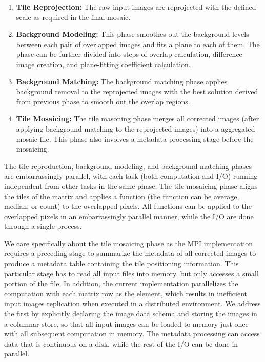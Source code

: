 \documentclass{acm_proc_article-sp}
\begin{document}
\begin{enumerate}
\item \textbf{Tile Reprojection:} The raw input images are reprojected with the defined scale as required in the
final mosaic. 
\item \textbf{Background Modeling:} This phase smoothes out the background levels between each pair of
overlapped images and fits a plane to each of them. The phase can be further divided into steps of overlap
calculation, difference image creation, and plane-fitting coefficient calculation.
\item \textbf{Background Matching:} The background matching phase applies background removal to the
reprojected images with the best solution derived from previous phase to smooth out the overlap regions.
\item \textbf{Tile Mosaicing:} The tile masoning phase merges all corrected images (after applying background
matching to the reprojected images) into a aggregated mosaic file. This phase also involves a metadata
processing stage before the mosaicing.
\end{enumerate}

The tile reproduction, background modeling, and background matching phases are embarrassingly
parallel, with each task (both computation and I/O) running independent from other tasks in the same
phase. The tile mosaicing phase aligns the tiles of the matrix and applies a function (the function can be
average, median, or count) to the overlapped pixels. All functions can be applied to the overlapped pixels
in an embarrassingly parallel manner, while the I/O are done through a single process.

We care specifically about the tile mosaicing phase as the MPI implementation requires a preceding
stage to summarize the metadata of all corrected images to produce a metadata table containing the tile
positioning information. This particular stage has to read all input files into memory, but only accesses a
small portion of the file. In addition, the current implementation parallelizes the computation with each matrix row
as the element, which results in inefficient input images replication when executed in a distributed
environment. We address the first by explicitly declaring the image data schema and storing the images
in a columnar store, so that all input images can be loaded to memory just once with all subsequent
computation in memory. The metadata processing can access data that is continuous on a disk, while the
rest of the I/O can be done in parallel.
\end{document}
